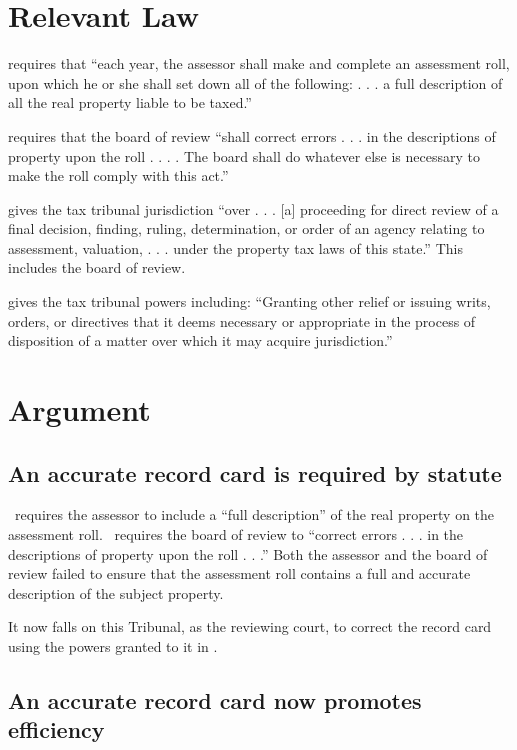 \documentclass[12pt,\documentclassflag]{michiganCourtOfAppealsBrief}
\begin{document}
\section{Relevant Law}

\cite{MCL 211.24(1)} requires that ``each year, the assessor shall make and complete an assessment roll, upon which he or she shall set down all of the following: . . . a full description of all the real property liable to be taxed.''

\cite{MCL 211.29(2)} requires that the board of review ``shall correct errors . . . in the descriptions of property upon the roll . . . . The board shall do whatever else is necessary to make the roll comply with this act.''

\cite{MCL 205.731} gives the tax tribunal jurisdiction ``over . . . [a] proceeding for direct review of a final decision, finding, ruling, determination, or order of an agency relating to assessment, valuation, . . .
under the property tax laws of this state.'' This includes the board of review.

\cite{MCL 205.732(c)} gives the tax tribunal powers including: ``Granting other relief or issuing writs, orders, or directives that it deems necessary or appropriate in the process of disposition of a matter over which it may acquire jurisdiction.''


\section{Argument}

\subsection{An accurate record card is required by statute}

\cite{MCL 211.24(1)}\ requires the assessor to include a ``full description'' of the real property on the assessment roll. \cite{MCL 211.29(2)}\ requires the board of review to ``correct errors . . . in the descriptions of property upon the roll . . .'' Both the assessor and the board of review failed to ensure that the assessment roll contains a full and accurate description of the subject property.

It now falls on this Tribunal, as the reviewing court, to correct the record card using the powers granted to it in \cite{MCL 205.732(c)}.

\subsection{An accurate record card now promotes efficiency}
\end{document}

